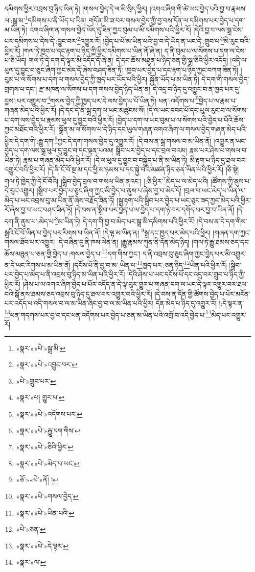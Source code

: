 དམིགས་ཕྱིར་འབྲས་བུ་ཉིད་ཡིན་ཏེ། །གསལ་བྱེད་དེ་ལ་མི་སྲིད་ཕྱིར། །འགའ་ཞིག་གི་ཚེ་ཡང་བྱེད་པའི་བྱ་བ་རྣམས་ལ་:སྒྲ་མ་\footnote{«སྣར་»«པེ་»སྒྲ་མི་}དམིགས་པ་ནི་ཡོད་པ་ཡིན། གདོན་མི་ཟ་བར་གསལ་བྱེད་ཀྱི་བྱ་བས་དོན་ལ་དམིགས་པར་བྱེད་པ་དག་མ་ཡིན་ཏེ། འགའ་ཞིག་ན་གསལ་བྱེད་ཡོད་དུ་ཟིན་ཀྱང་བུམ་པ་མི་དམིགས་པའི་ཕྱིར་རོ། །དེའི་བྱ་བ་ལས་སྒྲ་ངེས་པར་དམིགས་པ་དེས་དེ་:བྱུང་བར་\footnote{«སྣར་»«པེ་»འབྱུང་བར་}འགྱུར་རོ། །བྱེད་པ་པོ་མ་ཡིན་པའི་བྱ་བ་དེ་ཡོད་ན་ཡང་དེ་:གྲུབ་པ་\footnote{«པེ་»གྲུབ་པར་}མི་རུང་བའི་ཕྱིར་རོ། །གལ་ཏེ་ཁྱབ་པ་དང་རྟག་པ་ཉིད་ཀྱི་ཕྱིར་དམིགས་པ་ཡིན་ནོ་ཞེ་ན། ད་ནི་བུམ་པ་ལ་སོགས་པ་དག་ལ་ངེས་པ་ཅི་ཡོད། གལ་ཏེ་དེ་དག་དེ་ལྟར་མི་འདོད་དོ་ཞེ་ན། དེ་དང་ཆོས་མཐུན་པ་ཉིད་ཅན་གྱི་སྒྲ་ཅིའི་ཕྱིར་འདོད། །འདི་ལ་ཕུལ་དུ་བྱུང་བ་ཅུང་ཞིག་ཀྱང་མེད་དོ་ཞེས་བཤད་ཟིན་ཏོ། །ཁྱབ་པར་བྱེད་པ་དང་རྟག་པ་ཉིད་ཀྱང་བཀག་ཟིན་ཏོ། །བུམ་པ་ལ་སོགས་པ་དག་ལ་གསལ་བྱེད་ཀྱི་ཁྱད་པར་ཡོད་པའི་ཕྱིར། སྐྱོན་ཡོད་པ་མ་ཡིན་ཏེ། དེ་དག་གི་གསལ་བྱེད་གྲགས་པ་དང་། རྫ་མཁན་ལ་སོགས་པ་དག་གསལ་བྱེད་ཉིད་ཡིན་ན། དེ་འདྲ་བ་ཉིད་དུ་འགྱུར་བ་ན་ཁྱད་པར་དུ་བྱས་:པར་འགྱུར་བ་\footnote{«སྣར་»པ། གྱུར་པ་}གསལ་བྱེད་ཀྱི་ཁྱད་པར་དེ་ལས་བྱེད་པ་པོ་ཡིན་ཏེ། ཕན་:འདོགས་པ་\footnote{«སྣར་»«པེ་»འདོགས་པར་}བྱེད་པ་ལ་རྣམ་པ་གཞན་མེད་པའི་ཕྱིར་རོ། །དེ་དང་དེ་ནི་སྒྲ་དག་ལ་ཡང་མཚུངས་སོ། །དེ་ལ་ཡང་དབང་པོ་དང་ཡུལ་རུང་བ་ལ་སོགས་པ་དག་ལས་བྱེད་པ་རྣམས་ཕུལ་དུ་བྱུང་བའི་ཕྱིར་རོ། །བྱེད་པ་དག་ལ་ཡང་བུམ་པ་ལ་སོགས་པའི་བྱེད་པ་པོའི་ཆོས་ཀྱང་མཐོང་བའི་ཕྱིར་རོ། །སྒྲོན་མ་ལ་སོགས་པ་དེ་ཉིད་དང་ཡུལ་གཞན་འགའ་ཞིག་ལ་གསལ་བྱེད་གཞན་མེད་པའི་ཕྱིར་དེ་དག་གི་:རྒྱུ་དག་\footnote{«སྣར་»«པེ་»རྒྱུ་དག་གིས་}ཀྱང་དེ་དག་གསལ་བྱེད་དུ་འགྱུར་རོ། །དེ་བས་ན་སྒྲ་གསལ་བ་མ་ཡིན་ནོ། །འགྱུར་ན་ཡང་བྱེད་པ་དག་ལས་སྒྲ་ཕུལ་དུ་བྱུང་བ་དང་ལྡན་པའམ། སྒྲིབ་པར་བྱེད་པ་དང་བྲལ་བའམ། རྣམ་པར་ཤེས་པ་གསལ་བ་ཡིན་ཏེ། རྣམ་པ་གཞན་མེད་པའི་ཕྱིར་རོ། །དེ་ལ་ཕུལ་དུ་བྱུང་བ་བསྐྱེད་པ་ནི་མ་ཡིན་ཏེ། མི་རྟག་པ་ཉིད་དུ་ཐལ་བར་འགྱུར་བའི་ཕྱིར་རོ། །དེ་ནི་ངོ་བོ་སྔ་མ་དང་ཕྱི་མ་ཉམས་པ་དང་སྐྱེ་བའི་མཚན་ཉིད་ཅན་ཡིན་པའི་ཕྱིར་རོ། །ཅི་སྟེ། གལ་ཏེ་ཁྱེད་ཀྱི་དེ་ངོ་བོའི། །སྒྲིབ་བྱེད་བྲལ་བ་གསལ་ཡིན་ནའང་། །:ཅི་ཕྱིར་\footnote{«སྣར་»«པེ་»ཅིའི་ཕྱིར་}མེད་པ་ལ་མེད་པའི། །ཚོགས་ཀྱི་ནུས་པ་དེ་རུང་འགྱུར། །སྒྲིབ་པར་བྱེད་པ་ཅུང་ཞིག་ཀྱང་མི་བྱེད་པ་ནུས་པ་ཞེས་བྱ་བ་མེད་དོ། །བྲལ་བ་ཡང་མེད་པ་ཡིན་ལ་མེད་པ་ཡང་འབྲས་བུ་མ་ཡིན་ནོ་ཞེས་བརྗོད་ཟིན་ཏོ། །སྒྲ་རྟག་པའི་སྒྲིབ་པར་བྱེད་པ་ཡང་ཅུང་ཟད་ཀྱང་མེད་པའི་ཕྱིར་རོ་ཞེས་བྱ་བ་ཡང་བཤད་ཟིན་ཏོ། །དེ་བས་ན་སྒྲིབ་པར་བྱེད་པ་ལ་བྱེད་པ་དག་ཉེ་བར་དགོད་པར་བྱ་བ་ཡིན་ནོ། །དེ་དག་ནི་ནུས་པ་:མེད་པ་\footnote{«སྣར་»«པེ་»མེད་པ་ཡང་}མ་ཡིན་ཏེ། དེ་དག་གི་བྱ་བ་མེད་པར་སྒྲ་མི་དམིགས་པའི་ཕྱིར་རོ། །དེ་བས་ན་དེ་དག་གིས་སྒྲའི་ངོ་བོ་ཡིན་པ་བྱེད་པར་རིགས་པ་ཡིན་ནོ། །དེ་ལྟ་མ་ཡིན་ན། \footnote{«ཅོ་»«པེ་»ནོ། ། }སྒྲ་དང་ཁྱད་པར་མེད་པའི་ཕྱིར། །གཞན་དག་ཀྱང་གསལ་ཐོབ་པར་འགྱུར། །དེ་བཞིན་དུ་ནི་ཁས་ལེན་ན། །རྒྱུ་རྣམས་ཀུན་ནི་དོན་མེད་ཉིད། །གལ་ཏེ་རྒྱུ་ཐམས་ཅད་དང་ཆོས་མཐུན་པ་ཅན་གྱི་བྱེད་པ་:གསལ་བྱེད་པ་\footnote{«སྣར་»«པེ་»གསལ་བྱེད་}དག་གིས་ཀྱང་། ད་ནི་འབྲས་བུ་ཅུང་ཞིག་ཀྱང་བྱེད་པར་མི་འགྱུར་ན་དེ་ཡང་རིགས་པ་མ་ཡིན་ནོ། །དངོས་པོ་ནི་བྱ་བ་མ་:ཡིན་པ་\footnote{«སྣར་»«པེ་»ཡིན་པའི་}ཁྱད་པར་:ཅན་ཉིད་\footnote{«པེ་»ཅན་}ཡིན་པའི་ཕྱིར་རོ། །སྒྲིབ་པར་བྱེད་པ་མེད་པ་ནི་འབྲས་བུ་ཉིད་མ་ཡིན་པའི་ཕྱིར་རོ། །དེའི་ཤེས་པ་ཡང་དངོས་པོ་དང་འདྲ་བར་གྲུབ་པ་ཉིད་ཀྱི་ཕྱིར་རོ། །ཤེས་པ་ལ་འགའ་ཞིག་བྱེད་པ་པོར་འདོད་ན་དེ་ལྟ་བུར་གྱུར་པ་གཞན་དག་ལ་ཡང་དེ་ལྟར་འགྱུར་བར་ཐལ་བའི་སྒོ་ནས་ཐམས་ཅད་འབྲས་བུ་ཉིད་དུ་ཐལ་བར་འགྱུར་བའི་ཕྱིར་རོ། །དེ་བས་ན་དོན་གྱི་ཚོགས་བྱེད་པ་པོར་མངོན་པར་འདོད་པ་འདི་གསལ་བ་ལ་མ་ཡིན་ཞིང་བྱ་བ་ལ་མ་ཡིན་པའི་ཕྱིར། དོན་མེད་པ་ཉིད་དུ་འགྱུར་རོ། །:དེ་ལྟར་ན་\footnote{«སྣར་»«པེ་»དེ་ལྟར་}ཕན་གདགས་པར་བྱ་བ་དང་ཕན་འདོགས་པར་བྱེད་པ་ཅན་མ་ཡིན་པའི་འགྲོ་བ་འདི་བྱེད་པ་\footnote{«སྣར་»ལ་}མེད་པར་འགྱུར་རོ། 